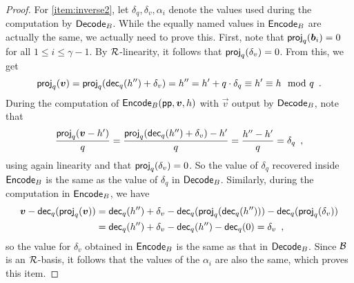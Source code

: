 \begin{proof}
\bigskip\noindent
For \autoref{item:inverse2}, let $\delta_q, \delta_v, \alpha_i$ denote the values used during the computation by $\mathsf{Decode}_B$.
While the equally named values in $\mathsf{Encode}_B$ are actually the same, we actually need to prove this.
First, note that $\mathsf{proj}_q(\boldsymbol{b}_i) = 0$ for all $1\leq i \leq \gamma-1$.
By $\mathcal{R}$-linearity, it follows that $\mathsf{proj}_q(\delta_v) = 0$. From this, we get
\[
 \mathsf{proj}_q(\boldsymbol{v}) = \mathsf{proj}_q(\mathsf{dec}_q(h'') + \delta_v) = h'' = h' + q\cdot \delta_q \equiv h' \equiv h \mod q\enspace.
\]
During the computation of $\mathsf{Encode}_B(\mathsf{pp}, \boldsymbol{v}, h)$ with $\vec{v}$ output by $\mathsf{Decode}_B$, note that
\[
 \frac{\mathsf{proj}_q(\boldsymbol{v} - h')}{q} = \frac{\mathsf{proj}_q(\mathsf{dec}_q(h'')+\delta_v)-h'}{q} = \frac{h''-h'}{q} = \delta_q\enspace,
\]
using again linearity and that $\mathsf{proj}_q(\delta_v) = 0$. So the value of $\delta_q$ recovered inside $\mathsf{Encode}_B$ is the same as the value of $\delta_q$ in $\mathsf{Decode}_B$.
Similarly, during the computation in $\mathsf{Encode}_B$, we have
\begin{align*}
 \boldsymbol{v}-\mathsf{dec}_q(\mathsf{proj}_q(\boldsymbol{v})) &= \mathsf{dec}_q(h'') + \delta_v - \mathsf{dec}_q(\mathsf{proj}_q(\mathsf{dec}_q(h''))) - \mathsf{dec}_q(\mathsf{proj}_q(\delta_v))\\
 {}&=\mathsf{dec}_q(h'') + \delta_v - \mathsf{dec}_q(h'') - \mathsf{dec}_q(0) = \delta_v\enspace,
\end{align*}
so the value for $\delta_v$ obtained in $\mathsf{Encode}_B$ is the same as that in $\mathsf{Decode}_B$.
Since $\mathcal{B}$ is an $\mathcal{R}$-basis, it follows that the values of the $\alpha_i$ are also the same, which proves this item.


\end{proof}
